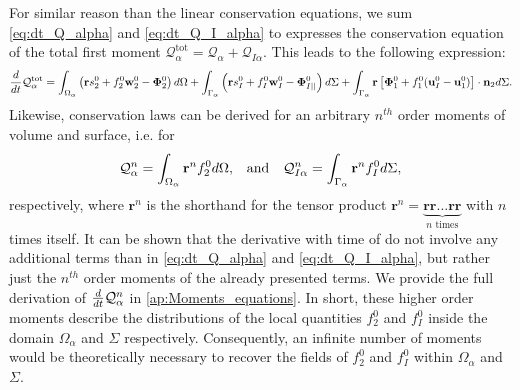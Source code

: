 For similar reason than the linear conservation equations, we sum \ref{eq:dt_Q_alpha} and \ref{eq:dt_Q_I_alpha} to expresses the conservation equation of the total first moment $\mathcal{Q}_\alpha^\text{tot} = \mathcal{Q}_\alpha + \mathcal{Q}_{I\alpha}$.
This leads to the following expression:
\begin{multline}
    \frac{d}{d t} {\mathcal{Q}_\alpha^\text{tot}}
    = \int_{\Omega_\alpha}  \left(
        \textbf{r} s_2^0         
        + f_2^0  \textbf{w}_2^0 
        - \mathbf{\Phi}_2^0
    \right)  d\Omega
    + \int_{\Gamma_\alpha}  \left(
        \textbf{r}s_I^0
        + f_I^0 \textbf{w}_I^0
        - \mathbf{\Phi}_{I||}^0
    \right)  d\Sigma
    + \int_{\Gamma_\alpha}  \textbf{r} \left[
        \mathbf{\Phi}_1^0
        + f_1^0 (\textbf{u}_I^0-\textbf{u}_1^0)
    \right]\cdot \textbf{n}_2   d\Sigma. 
    \label{eq:dt_Q_alpha_tot}
\end{multline}
Likewise, conservation laws can be derived for an arbitrary $n^{th}$ order moments of volume and surface, i.e. for
\begin{align}
    \mathcal{Q}_\alpha^n
    = \int_{\Omega_\alpha} 
        \textbf{r}^n
        f_2^0  d\Omega,
        && \text{and} &&
    \mathcal{Q}_{I\alpha}^n
    = \int_{\Gamma_\alpha} 
        \textbf{r}^n
    f_I^0  d\Sigma,
    \label{eq:Q_n_definition}
\end{align} 
respectively, where $\textbf{r}^n$ is the shorthand for the tensor product $\textbf{r}^n = \underbrace{\textbf{rr}\ldots \textbf{rr}}_{n\text{ times}} $ with $n$ times itself. 
It can be shown that the derivative with time of do not involve any additional terms than in \ref{eq:dt_Q_alpha} and \ref{eq:dt_Q_I_alpha}, but rather just the $n^{th}$ order moments of the already presented terms.
We provide the full derivation of $\frac{d}{d t}{ \mathcal{Q}_\alpha^n}$ in \ref{ap:Moments_equations}.
In short, these higher order moments describe the distributions of the local quantities $f_2^0$ and $f_I^0$ inside the domain $\Omega_\alpha$ and $\Sigma$ respectively.
Consequently, an infinite number of moments would be theoretically necessary to recover the fields of $f_2^0$ and $f_I^0$  within $\Omega_\alpha$ and $\Sigma$. 


